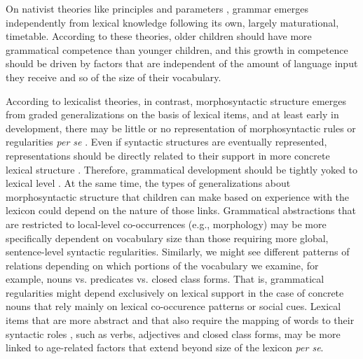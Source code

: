 \documentclass[10pt,letterpaper]{article}
\begin{document}
On nativist theories like principles and parameters \cite{chomsky1981, baker2005}, grammar emerges independently from lexical knowledge following its own, largely maturational, timetable. According to these theories, older children should have more grammatical competence than younger children, and this growth in competence should be driven by factors that are independent of the amount of language input they receive and so of the size of their vocabulary.

According to lexicalist theories, in contrast, morphosyntactic structure emerges from graded generalizations on the basis of lexical items, and at least early in development, there may be little or no representation of morphosyntactic rules or regularities \emph{per se} \cite{tomasello2003}. Even if syntactic structures are eventually represented, representations should be directly related to their support in more concrete lexical structure \cite{bannard2009}. Therefore, grammatical development should be tightly yoked to lexical level \cite{bates1999}.  At the same time, the types of generalizations about morphosyntactic structure that children can make based on experience with the lexicon could depend on the nature of those links.  Grammatical abstractions that are restricted to local-level co-occurrences (e.g., morphology) may be more specifically dependent on vocabulary size than those requiring more global, sentence-level syntactic regularities. Similarly, we might see different patterns of relations depending on which portions of the vocabulary we examine, for example, nouns vs. predicates vs. closed class forms. That is, grammatical regularities might depend exclusively on lexical support in the case of concrete nouns that rely mainly on lexical co-occurence patterns or social cues. Lexical items that are more abstract and that also require the mapping of words to their syntactic roles \cite{gleitman1990}, such as verbs, adjectives and closed class forms, may be more linked to age-related factors that extend beyond size of the lexicon \emph{per se}.

\end{document}
